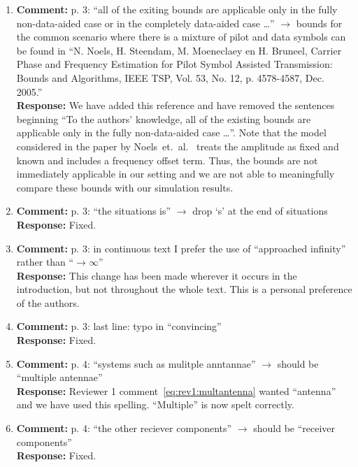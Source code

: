 \documentclass{article}
\begin{document}
\begin{enumerate}
\item \textbf{Comment:} p. 3: ``all of the exiting bounds are applicable only in the fully non-data-aided case or in the completely data-aided case \dots'' $\to$ bounds for the common scenario where there is a mixture of pilot and data symbols can be found in ``N. Noels, H. Steendam, M. Moeneclaey en H. Bruneel, Carrier Phase and Frequency Estimation for Pilot Symbol Assisted Transmission: Bounds and Algorithms, IEEE TSP, Vol. 53, No. 12, p. 4578-4587, Dec. 2005.'' \\
\textbf{Response:} We have added this reference and have removed the sentences beginning ``To the authors' knowledge, all of the existing bounds are applicable only in the fully non-data-aided case \dots''. Note that the model considered in the paper by Noels~et.~al.~\cite{Noels_crbs_with_pilots_2005} treats the amplitude as fixed and known and includes a frequency offset term.  Thus, the bounds are not immediately applicable in our setting and we are not able to meaningfully compare these bounds with our simulation results.  %

\item \textbf{Comment:} p. 3: ``the situations is'' $\to$ drop `s' at the end of situations \\
\textbf{Response:} Fixed.

\item \textbf{Comment:} p. 3: in continuous text I prefer the use of ``approached infinity'' rather than ``$\to \infty$'' \\
\textbf{Response:} This change has been made wherever it occurs in the introduction, but not throughout the whole text. This is a personal preference of the authors.

\item \textbf{Comment:} p. 3: last line: typo in ``convincing'' \\
\textbf{Response:} Fixed.

\item \textbf{Comment:} p. 4: ``systems such as mulitple anntannae'' $\to$ should be ``multiple antennae'' \\
\textbf{Response:} Reviewer 1 comment~\eqref{eq:rev1:multantenna} wanted ``antenna'' and we have used this spelling. ``Multiple'' is now spelt correctly.

\item \textbf{Comment:} p. 4: ``the other reciever components'' $\to$ should be ``receiver components'' \\
\textbf{Response:} Fixed.


\end{enumerate}
\end{document}
